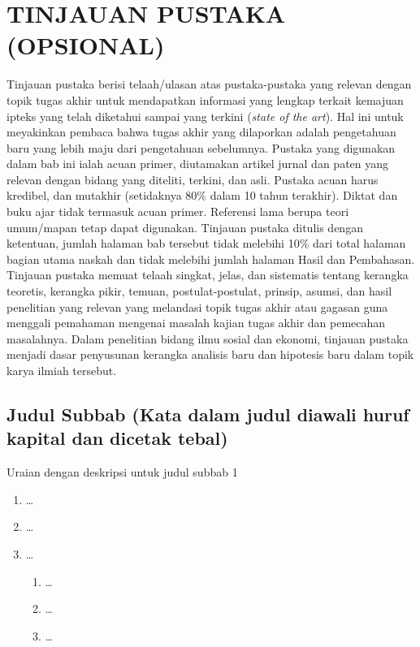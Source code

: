 
\chapter{TINJAUAN PUSTAKA (OPSIONAL)}

Tinjauan pustaka berisi telaah/ulasan atas pustaka-pustaka yang relevan dengan
topik tugas akhir untuk mendapatkan informasi yang lengkap terkait kemajuan
ipteks yang telah diketahui sampai yang terkini (\textit{state of the art}).
Hal ini untuk meyakinkan pembaca bahwa tugas akhir yang dilaporkan adalah
pengetahuan baru yang lebih maju dari pengetahuan sebelumnya. Pustaka yang
digunakan dalam bab ini ialah acuan primer, diutamakan artikel jurnal dan paten
yang relevan dengan bidang yang diteliti, terkini, dan asli. Pustaka acuan harus
kredibel, dan mutakhir (setidaknya 80\% dalam 10 tahun terakhir). Diktat dan
buku ajar tidak termasuk acuan primer. Referensi lama berupa teori umum/mapan
tetap dapat digunakan. Tinjauan pustaka ditulis dengan ketentuan, jumlah halaman
bab tersebut tidak melebihi 10\% dari total halaman bagian utama naskah dan
tidak melebihi jumlah halaman Hasil dan Pembahasan. Tinjauan pustaka memuat
telaah singkat, jelas, dan sistematis tentang kerangka teoretis, kerangka pikir,
temuan, postulat-postulat, prinsip, asumsi, dan hasil penelitian yang relevan
yang melandasi topik tugas akhir atau gagasan guna menggali pemahaman mengenai
masalah kajian tugas akhir dan pemecahan masalahnya. Dalam penelitian bidang
ilmu sosial dan ekonomi, tinjauan pustaka menjadi dasar penyusunan kerangka
analisis baru dan hipotesis baru dalam topik karya ilmiah tersebut.

\section[Judul Subbab]{Judul Subbab (Kata dalam judul diawali huruf kapital dan dicetak tebal)}

Uraian dengan deskripsi untuk judul subbab 1 \dotfill

\noindent\dotfill

\noindent\dotfill

\begin{enumerate}[label=\alph*,leftmargin=0.75cm,labelwidth=0.5cm,
  labelsep=0.25cm,align=left,itemsep=0pt,parsep=0pt,topsep=0pt,partopsep=0pt]
  \item \ldots
  \item \ldots
  \item \ldots
  \begin{enumerate}[label=\arabic*),leftmargin=0.75cm,labelwidth=0.5cm,
    labelsep=0.25cm,align=left,itemsep=0pt,parsep=0pt,topsep=0pt,partopsep=0pt]
    \item \ldots
    \item \ldots
    \item \ldots
  \end{enumerate}
\end{enumerate}

